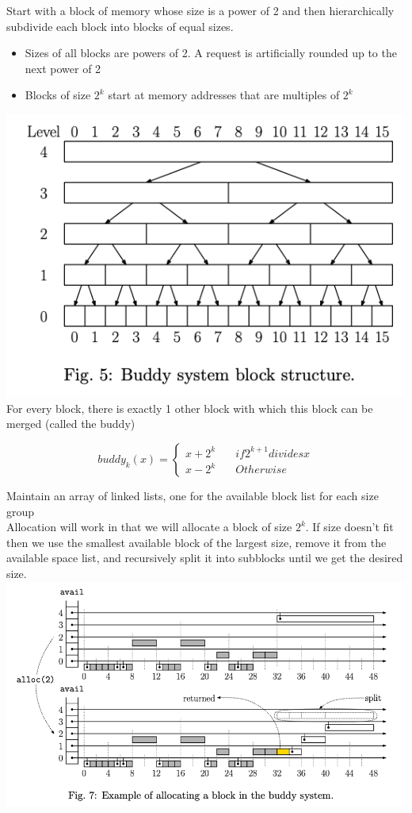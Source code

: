 \documentclass{article}
\begin{document}
  Start with a block of memory whose size is a power of 2 and then hierarchically subdivide each block into blocks of equal sizes.
  \begin{itemize}[noitemsep]
    \item Sizes of all blocks are powers of 2. A request is artificially rounded up to the next power of 2
    \item Blocks of size $2^{k}$ start at memory addresses that are multiples of $2^{k}$
  \end{itemize}
  \includegraphics[width=\textwidth]{BuddySystem}
  For every block, there is exactly 1 other block with which this block can be merged (called the buddy)
  \begin{center}
    \[
      buddy_{k}(x) = \left\{
        \begin{array}{ll}
          x + 2^{k} & \quad if 2^{k+1} divides x \\
          x - 2^{k} & \quad Otherwise
        \end{array}
    \right.
  \]
  \end{center}
  Maintain an array of linked lists, one for the available block list for each size group\\
  Allocation will work in that we will allocate a block of size $2^{k}$. If size doesn't fit then we use the smallest available block of the largest size, remove it from the available space list, and recursively split it into subblocks until we get the desired size.\\
  \includegraphics[width=\textwidth]{BuddySystemInsertion}
\end{document}
